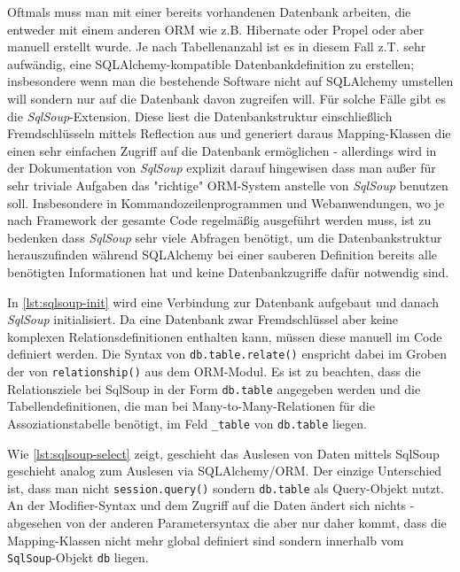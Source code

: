 Oftmals muss man mit einer bereits vorhandenen Datenbank arbeiten, die entweder
mit einem anderen ORM wie z.B. Hibernate oder Propel oder aber manuell erstellt
wurde. Je nach Tabellenanzahl ist es in diesem Fall z.T. sehr aufwändig, eine
SQLAlchemy-kompatible Datenbankdefinition zu erstellen; insbesondere wenn man
die bestehende Software nicht auf SQLAlchemy umstellen will sondern nur auf die
Datenbank davon zugreifen will. Für solche Fälle gibt es die
\emph{SqlSoup}-Extension. Diese liest die Datenbankstruktur einschließlich
Fremdschlüsseln mittels Reflection aus und generiert daraus Mapping-Klassen die
einen sehr einfachen Zugriff auf die Datenbank ermöglichen - allerdings wird in
der Dokumentation von \emph{SqlSoup} explizit darauf hingewisen dass man außer
für sehr triviale Aufgaben das "richtige" ORM-System anstelle von \emph{SqlSoup}
benutzen soll. Insbesondere in Kommandozeilenprogrammen und Webanwendungen, wo
je nach Framework der gesamte Code regelmäßig ausgeführt werden muss, ist zu
bedenken dass \emph{SqlSoup} sehr viele Abfragen benötigt, um die
Datenbankstruktur herauszufinden während SQLAlchemy bei einer sauberen
Definition bereits alle benötigten Informationen hat und keine Datenbankzugriffe
dafür notwendig sind.

In \autoref{lst:sqlsoup-init} wird eine Verbindung zur Datenbank aufgebaut und
danach \emph{SqlSoup} initialisiert. Da eine Datenbank zwar Fremdschlüssel aber
keine komplexen Relationsdefinitionen enthalten kann, müssen diese manuell im
Code definiert werden. Die Syntax von \texttt{db.table.relate()} enspricht dabei
im Groben der von \texttt{relationship()} aus dem ORM-Modul. Es ist zu beachten,
dass die Relationsziele bei SqlSoup in der Form \texttt{db.table} angegeben
werden und die Tabellendefinitionen, die man bei Many-to-Many-Relationen für die
Assoziationstabelle benötigt, im Feld \texttt{\_table} von \texttt{db.table}
liegen.



Wie \autoref{lst:sqlsoup-select} zeigt, geschieht das Auslesen von Daten mittels
SqlSoup geschieht analog zum Auslesen via SQLAlchemy/ORM. Der einzige
Unterschied ist, dass man nicht \texttt{session.query()} sondern
\texttt{db.table} als Query-Objekt nutzt. An der Modifier-Syntax und dem Zugriff
auf die Daten ändert sich nichts - abgesehen von der anderen Parametersyntax die
aber nur daher kommt, dass die Mapping-Klassen nicht mehr global definiert sind
sondern innerhalb vom \texttt{SqlSoup}-Objekt \texttt{db} liegen.

